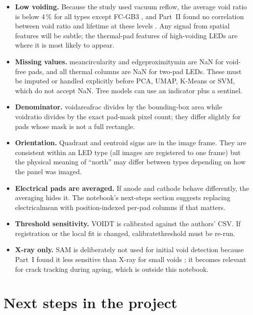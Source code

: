 \documentclass[11pt,a4paper]{article}
\newcommand{\code}[1]{{\ttfamily\def\_{\textunderscore\allowbreak}#1}}
\begin{document}
\begin{itemize}
  \item \textbf{Low voiding.} Because the study used vacuum reflow, the average void ratio is
        below 4\,\% for all types except FC-GB3 \cite{part1}, and Part~II found no
        correlation between void ratio and lifetime at these levels \cite{part2}. Any signal
        from spatial features will be subtle; the thermal-pad features of high-voiding LEDs are
        where it is most likely to appear.
  \item \textbf{Missing values.} \code{mean\_circularity} and \code{edge\_proximity\_min} are
        \code{NaN} for void-free pads, and all \code{thermal\_*} columns are \code{NaN} for
        two-pad LEDs. These must be imputed or handled explicitly before PCA, UMAP, K-Means or
        SVM, which do not accept \code{NaN}. Tree models can use an indicator plus a sentinel.
  \item \textbf{Denominator.} \code{void\_area\_frac} divides by the bounding-box area while
        \code{void\_ratio} divides by the exact pad-mask pixel count; they differ slightly for
        pads whose mask is not a full rectangle.
  \item \textbf{Orientation.} Quadrant and centroid signs are in the image frame. They are
        consistent within an LED type (all images are registered to one frame) but the physical
        meaning of ``north'' may differ between types depending on how the panel was imaged.
  \item \textbf{Electrical pads are averaged.} If anode and cathode behave differently, the
        averaging hides it. The notebook's next-steps section suggests replacing
        \code{electrical\_mean\_*} with position-indexed per-pad columns if that matters.
  \item \textbf{Threshold sensitivity.} \code{VOID\_T} is calibrated against the authors' CSV.
        If registration or the local fit is changed, \code{calibrate\_threshold} must be re-run.
  \item \textbf{X-ray only.} SAM is deliberately not used for initial void detection because
        Part~I found it less sensitive than X-ray for small voids \cite{part1}; it becomes
        relevant for crack tracking during ageing, which is outside this notebook.
\end{itemize}

\section{Next steps in the project}
\end{document}
